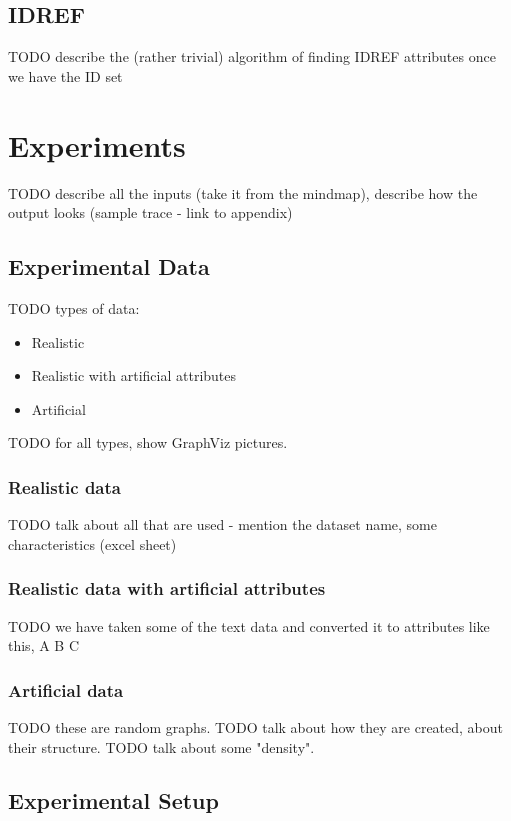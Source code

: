 \documentclass[a4paper,12pt,oneside]{report}
\begin{document}
\section{IDREF}

TODO describe the (rather trivial) algorithm of finding IDREF attributes once we have the ID set

\chapter{Experiments}

TODO describe all the inputs (take it from the mindmap), describe how the output looks (sample trace - link to appendix)

\section{Experimental Data}

TODO types of data:
\begin{itemize}
	\item Realistic 
  \item Realistic with artificial attributes
	\item Artificial
\end{itemize}

TODO for all types, show GraphViz pictures.

\subsection{Realistic data}

TODO talk about all that are used - mention the dataset name, some characteristics (excel sheet)

\subsection{Realistic data with artificial attributes}

TODO we have taken some of the text data and converted it to attributes like this, A B C

\subsection{Artificial data}

TODO these are random graphs.
TODO talk about how they are created, about their structure.
TODO talk about some "density".

\section{Experimental Setup}
\end{document}
